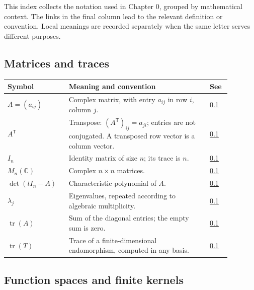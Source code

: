 This index collects the notation used in Chapter 0, grouped by mathematical context. The links in the final column lead to the relevant definition or convention. Local meanings are recorded separately when the same letter serves different purposes.

\subsection*{Matrices and traces}\label{v1a-notation-matrices}

\begin{longtable}{p{0.22\linewidth}p{0.58\linewidth}p{0.08\linewidth}}
\textbf{Symbol} & \textbf{Meaning and convention} & \textbf{See} \\ \hline
\(A=(a_{ij})\) & Complex matrix, with entry \(a_{ij}\) in row \(i\), column \(j\). & \hyperref[definition-the-trace]{0.1} \\
$A^{\mathsf{T}}$ & Transpose: $(A^{\mathsf{T}})_{ij}=a_{ji}$; entries are not conjugated. A transposed row vector is a column vector. & \hyperref[linear-algebra.transpose]{0.1} \\
\(I_n\) & Identity matrix of size \(n\); its trace is \(n\). & \hyperref[definition-the-trace]{0.1} \\
\(M_n(\mathbb C)\) & Complex \(n\times n\) matrices. & \hyperref[linear-algebra.trace-similarity]{0.1} \\
\(\det(tI_n-A)\) & Characteristic polynomial of \(A\). & \hyperref[linear-algebra.trace-eigenvalue-sum]{0.1} \\
\(\lambda_j\) & Eigenvalues, repeated according to algebraic multiplicity. & \hyperref[linear-algebra.trace-eigenvalue-sum]{0.1} \\
\(\operatorname{tr}(A)\) & Sum of the diagonal entries; the empty sum is zero. & \hyperref[definition-the-trace]{0.1} \\
\(\operatorname{tr}(T)\) & Trace of a finite-dimensional endomorphism, computed in any basis. & \hyperref[linear-algebra.endomorphism-trace]{0.1} \\
\end{longtable}

\subsection*{Function spaces and finite kernels}\label{v1a-notation-kernels}

